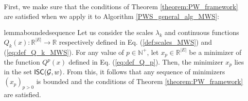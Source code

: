 \noindent First, we make sure that the conditions of Theorem \ref{theorem:PW_framework} are satisfied when we apply it to Algorithm \ref{PWS_general_alg_MWS}:
\begin{restatable}{lemma}{boundedsequence}
\label{lemma:bounded_sequence}
Let us consider the scales $\lambda_k$ and continuous functions ${Q_k(x): \mathbb{R}^{|E|} \rightarrow \mathbb{R}}$ respectively defined in Eq. (\ref{def:scales_MWS}) and (\ref{eq:def_Q_k_MWS}). For any value of $p\in \mathbb{N}^+$, let $x_p \in \mathbb{R}^{|E|}$ be a minimizer of the function $Q^p(x)$ defined in Eq. (\ref{eq:def_Q_p}). Then, the minimizer $x_p$ lies in the set $\mathsf{ISC}(\mathcal{G},w)$. From this, it follows that any sequence of minimizers $(x_p)_{p>0}$ is bounded and the conditions of Theorem \ref{theorem:PW_framework} are satisfied.
\end{restatable}
